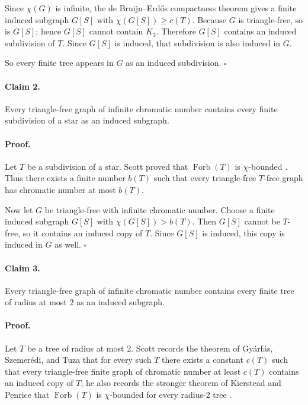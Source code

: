 Since $\chi(G)$ is infinite, the de Bruijn--Erd\H{o}s compactness theorem gives a finite induced subgraph $G[S]$ with $\chi(G[S])\ge c(T)$. Because $G$ is triangle-free, so is $G[S]$; hence $G[S]$ cannot contain $K_3$. Therefore $G[S]$ contains an induced subdivision of $T$. Since $G[S]$ is induced, that subdivision is also induced in $G$.

So every finite tree appears in $G$ as an induced subdivision. \hfill $\square$

\paragraph{Claim 2.} Every triangle-free graph of infinite chromatic number contains every finite subdivision of a star as an induced subgraph.

\paragraph{Proof.}
Let $T$ be a subdivision of a star. Scott proved that $\operatorname{Forb}(T)$ is $\chi$-bounded \cite[Corollary~2]{Scott97}. Thus there exists a finite number $b(T)$ such that every triangle-free $T$-free graph has chromatic number at most $b(T)$.

Now let $G$ be triangle-free with infinite chromatic number. Choose a finite induced subgraph $G[S]$ with $\chi(G[S])>b(T)$. Then $G[S]$ cannot be $T$-free, so it contains an induced copy of $T$. Since $G[S]$ is induced, this copy is induced in $G$ as well. \hfill $\square$

\paragraph{Claim 3.} Every triangle-free graph of infinite chromatic number contains every finite tree of radius at most $2$ as an induced subgraph.

\paragraph{Proof.}
Let $T$ be a tree of radius at most $2$. Scott records the theorem of Gy\'{a}rf\'{a}s, Szemer\'{e}di, and Tuza that for every such $T$ there exists a constant $c(T)$ such that every triangle-free finite graph of chromatic number at least $c(T)$ contains an induced copy of $T$; he also records the stronger theorem of Kierstead and Penrice that $\operatorname{Forb}(T)$ is $\chi$-bounded for every radius-$2$ tree \cite[p.~2, Theorem~B]{Scott97}.

